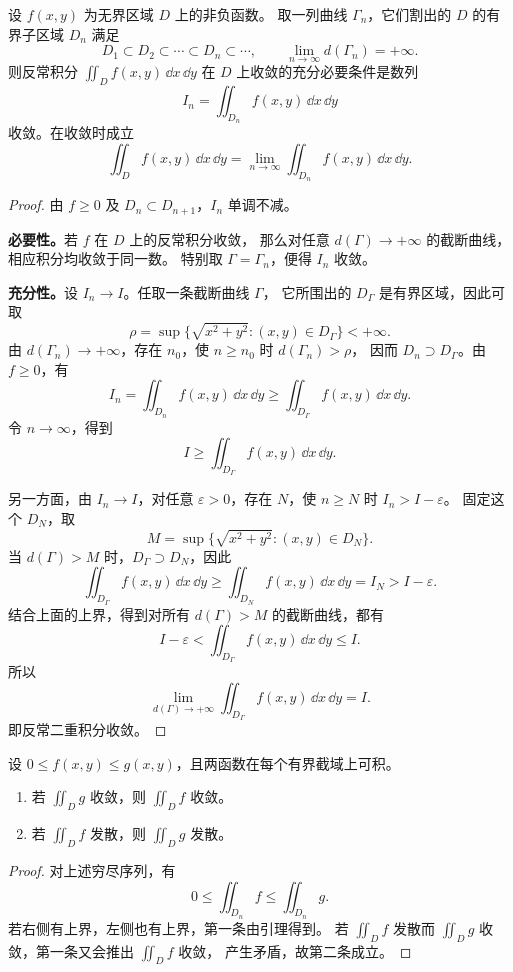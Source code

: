 \begin{lemma}\label{p2-improper-exhaustion}
设 $f(x,y)$ 为无界区域 $D$ 上的非负函数。
取一列曲线 $\Gamma_n$，它们割出的 $D$ 的有界子区域 $D_n$ 满足
\[
D_1\subset D_2\subset\cdots\subset D_n\subset\cdots,
\qquad\lim_{n\to\infty}d(\Gamma_n)=+\infty.
\]
则反常积分 $\displaystyle\iint_Df(x,y)\,\dd x\,\dd y$ 在 $D$ 上收敛的充分必要条件是数列
\[
I_n=\displaystyle\iint_{D_n}f(x,y)\,\dd x\,\dd y
\]
收敛。在收敛时成立
\[
\displaystyle\iint_Df(x,y)\,\dd x\,\dd y
=\lim_{n\to\infty}\displaystyle\iint_{D_n}f(x,y)\,\dd x\,\dd y.
\]
\end{lemma}
\begin{proof}
由 $f\ge0$ 及 $D_n\subset D_{n+1}$，$I_n$ 单调不减。

\textbf{必要性。}若 $f$ 在 $D$ 上的反常积分收敛，
那么对任意 $d(\Gamma)\to+\infty$ 的截断曲线，相应积分均收敛于同一数。
特别取 $\Gamma=\Gamma_n$，便得 $I_n$ 收敛。

\textbf{充分性。}设 $I_n\to I$。任取一条截断曲线 $\Gamma$，
它所围出的 $D_\Gamma$ 是有界区域，因此可取
\[
\rho=\sup\{\sqrt{x^2+y^2}:(x,y)\in D_\Gamma\}<+\infty.
\]
由 $d(\Gamma_n)\to+\infty$，存在 $n_0$，使 $n\ge n_0$ 时 $d(\Gamma_n)>\rho$，
因而 $D_n\supset D_\Gamma$。由 $f\ge0$，有
\[
I_n=\displaystyle\iint_{D_n}f(x,y)\,\dd x\,\dd y
\ge\displaystyle\iint_{D_\Gamma}f(x,y)\,\dd x\,\dd y.
\]
令 $n\to\infty$，得到
\[
I\ge\displaystyle\iint_{D_\Gamma}f(x,y)\,\dd x\,\dd y.
\]

另一方面，由 $I_n\to I$，对任意 $\varepsilon>0$，存在 $N$，使 $n\ge N$ 时 $I_n>I-\varepsilon$。
固定这个 $D_N$，取
\[
M=\sup\{\sqrt{x^2+y^2}:(x,y)\in D_N\}.
\]
当 $d(\Gamma)>M$ 时，$D_\Gamma\supset D_N$，因此
\[
\displaystyle\iint_{D_\Gamma}f(x,y)\,\dd x\,\dd y
\ge\displaystyle\iint_{D_N}f(x,y)\,\dd x\,\dd y
=I_N>I-\varepsilon.
\]
结合上面的上界，得到对所有 $d(\Gamma)>M$ 的截断曲线，都有
\[
I-\varepsilon<\displaystyle\iint_{D_\Gamma}f(x,y)\,\dd x\,\dd y\le I.
\]
所以
\[
\lim_{d(\Gamma)\to+\infty}\displaystyle\iint_{D_\Gamma}f(x,y)\,\dd x\,\dd y=I.
\]
即反常二重积分收敛。
\end{proof}

\begin{theorem}[比较判别法]\label{p2-improper-comparison}
设 $0\le f(x,y)\le g(x,y)$，且两函数在每个有界截域上可积。
\begin{enumerate}
\item 若 $\displaystyle\iint_Dg$ 收敛，则 $\displaystyle\iint_Df$ 收敛。
\item 若 $\displaystyle\iint_Df$ 发散，则 $\displaystyle\iint_Dg$ 发散。
\end{enumerate}
\end{theorem}
\begin{proof}
对上述穷尽序列，有
\[
0\le\displaystyle\iint_{D_n}f\le\displaystyle\iint_{D_n}g.
\]
若右侧有上界，左侧也有上界，第一条由引理得到。
若 $\displaystyle\iint_Df$ 发散而 $\displaystyle\iint_Dg$ 收敛，第一条又会推出 $\displaystyle\iint_Df$ 收敛，
产生矛盾，故第二条成立。
\end{proof}


